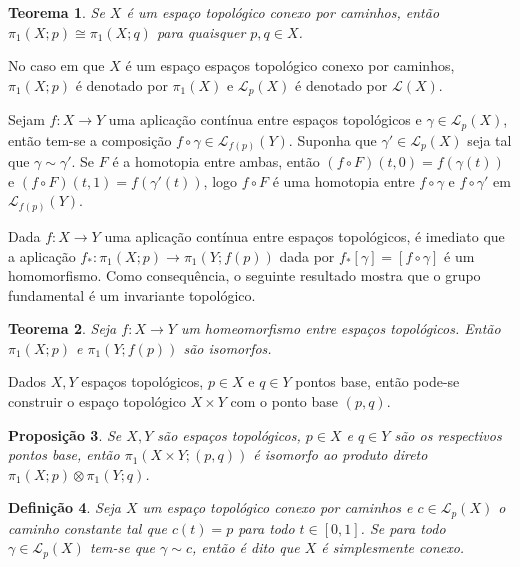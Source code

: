 \documentclass[12pt]{book}
\newtheorem{teorema}{Teorema}[section]
\newtheorem{definicao}[teorema]{Definição}
\newtheorem{proposicao}[teorema]{Proposição}
\newcommand{\caminhos}{\mathcal{L}}
\newcommand{\caminhossempontobase}[1]{\caminhos(#1)}
\newcommand{\caminhospontobasegeral}[2]{\caminhos_{#1}(#2)}
\newcommand{\classe}[1]{[#1]}
\newcommand{\grupofundamental}[1]{\pi_{1}(#1)}
\newcommand{\grupofundamentalpontobase}[2]{\pi_{1}(#1; #2)}
\newcommand{\intervalo}{[0,1]}
\begin{document}
	\begin{teorema}
		Se $X$ é um espaço topológico conexo por caminhos, então $\grupofundamentalpontobase{X}{p} \cong \grupofundamentalpontobase{X}{q}$ para quaisquer $p,q \in X$.
	\end{teorema}
	
	No caso em que $X$ é um espaço espaços topológico conexo por caminhos, $\grupofundamentalpontobase{X}{p}$ é denotado por $\grupofundamental{X}$ e $\caminhospontobasegeral{p}{X}$ é denotado por $\caminhossempontobase{X}$.
	
	
	Sejam $f:X\to Y$ uma aplicação contínua entre espaços topológicos e $\gamma \in \caminhospontobasegeral{p}{X}$, então tem-se a composição $f\circ \gamma \in \caminhospontobasegeral{f(p)}{Y}$. Suponha que $\gamma' \in \caminhospontobasegeral{p}{X}$ seja tal que $\gamma \sim \gamma'$. Se $F$ é a homotopia entre ambas, então $(f\circ F)(t,0) =  f(\gamma(t))$ e $(f\circ F)(t,1) =  f(\gamma'(t)) $, logo $f\circ F$ é uma homotopia entre $f\circ \gamma$ e $f\circ \gamma'$ em $\caminhospontobasegeral{f(p)}{Y}$.
	
	Dada $f:X\to Y$ uma aplicação contínua entre espaços topológicos, é imediato que a aplicação $f_{*}:\grupofundamentalpontobase{X}{p} \to \grupofundamentalpontobase{Y}{f(p)}$ dada por $f_{*}\classe{\gamma} = \classe{f\circ\gamma}$ é um homomorfismo. Como consequência, o seguinte resultado mostra que o grupo fundamental é um invariante topológico.
	
	\begin{teorema}
		Seja $f:X\to Y$ um homeomorfismo entre espaços topológicos. Então $\grupofundamentalpontobase{X}{p}$ e $\grupofundamentalpontobase{Y}{f(p)}$ são isomorfos.
	\end{teorema}
	
	Dados $X, Y$ espaços topológicos, $p\in X$ e $q\in Y$ pontos base, então pode-se construir o espaço topológico $X\times Y$ com o ponto base $(p,q)$.
	
	\begin{proposicao}\label{proposicao_produto_grupo_fundamental}
		Se $X, Y$ são espaços topológicos, $p\in X$ e $q\in Y$ são os respectivos pontos base, então $\grupofundamentalpontobase{X\times Y}{(p,q)}$ é isomorfo ao produto direto $\grupofundamentalpontobase{X}{p}\otimes \grupofundamentalpontobase{Y}{q}$.
	\end{proposicao}
	
	\begin{definicao}
		Seja $X$ um espaço topológico conexo por caminhos e
		$c \in \caminhospontobasegeral{p}{X}$ o caminho constante tal que $c(t) = p$ para todo $t \in \intervalo$. Se para todo $\gamma \in \caminhospontobasegeral{p}{X}$ tem-se que $\gamma \sim c$, então é dito que $X$ é simplesmente conexo.
	\end{definicao}
	
\end{document}
